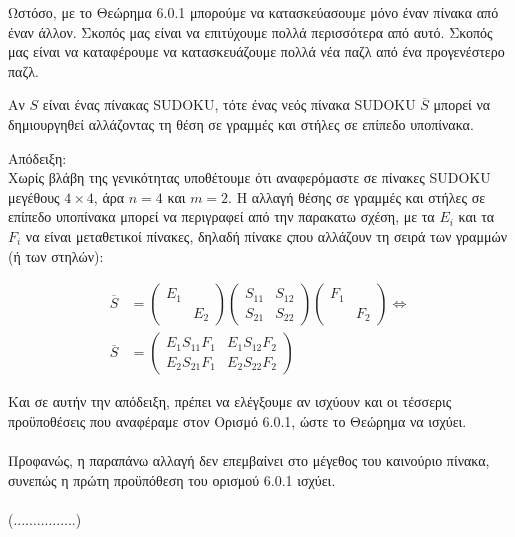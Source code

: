 \documentclass[12pt]{book}
\theoremstyle{definition}
\begin{document}
Ωστόσο, με το Θεώρημα 6.0.1 μπορούμε να κατασκεύασουμε μόνο έναν πίνακα από έναν άλλον. Σκοπός μας είναι να επιτύχουμε πολλά περισσότερα από αυτό. Σκοπός μας είναι να καταφέρουμε να κατασκευάζουμε πολλά νέα παζλ από ένα προγενέστερο παζλ. 

\begin{theorem}{}{}
	Αν \(S\) είναι ένας πίνακας SUDOKU, τότε ένας νεός πίνακα SUDOKU \(\overline{S}\) μπορεί να δημιουργηθεί αλλάζοντας τη θέση σε γραμμές και στήλες σε επίπεδο υποπίνακα.
\end{theorem}

Απόδειξη: \\
Χωρίς βλάβη της γενικότητας υποθέτουμε ότι αναφερόμαστε σε πίνακες SUDOKU μεγέθους \(4 \times 4\), άρα \(n = 4\) και \(m = 2\). Η αλλαγή θέσης σε γραμμές και στήλες σε επίπεδο υποπίνακα μπορεί να περιγραφεί από την παρακατω σχέση, με τα \(E_{i}\) και τα \(F_{i}\) να είναι μεταθετικοί πίνακες, δηλαδή πίνακε ςπου αλλάζουν τη σειρά των γραμμών (ή των στηλών): 

\begin{align*}
	\overline{S} &= \begin{pmatrix}
						E_{1} &  \\
							  & E_{2}
	\end{pmatrix}
	\begin{pmatrix}
		S_{11} & S_{12} \\
		S_{21} & S_{22}
	\end{pmatrix}
	\begin{pmatrix}
		F_{1} &  \\
		& F_{2}
	\end{pmatrix} \Leftrightarrow \\
	\overline{S} &= \begin{pmatrix}
						E_{1}S_{11}F_{1} & E_{1}S_{12}F_{2} \\
						E_{2}S_{21}F_{1} & E_{2}S_{22}F_{2}
					\end{pmatrix}
\end{align*}

Και σε αυτήν την απόδειξη, πρέπει να ελέγξουμε αν ισχύουν και οι τέσσερις προϋποθέσεις που αναφέραμε στον Ορισμό 6.0.1, ώστε το Θεώρημα να ισχύει. \\ \\ 

Προφανώς, η παραπάνω αλλαγή δεν επεμβαίνει στο μέγεθος του καινούριο πίνακα, συνεπώς η πρώτη προϋπόθεση του ορισμού 6.0.1 ισχύει. \\ \\ (................)
\end{document}
